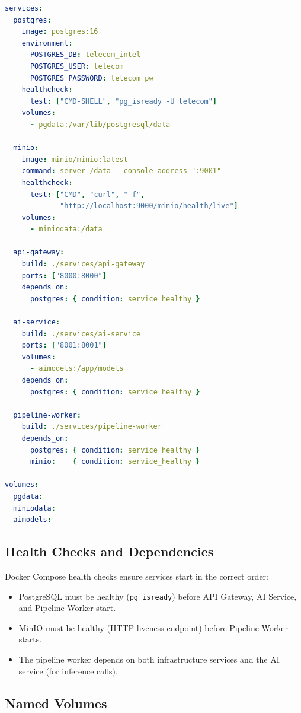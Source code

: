 \begin{lstlisting}[language=yaml, caption={Docker Compose configuration (simplified).}]
services:
  postgres:
    image: postgres:16
    environment:
      POSTGRES_DB: telecom_intel
      POSTGRES_USER: telecom
      POSTGRES_PASSWORD: telecom_pw
    healthcheck:
      test: ["CMD-SHELL", "pg_isready -U telecom"]
    volumes:
      - pgdata:/var/lib/postgresql/data

  minio:
    image: minio/minio:latest
    command: server /data --console-address ":9001"
    healthcheck:
      test: ["CMD", "curl", "-f", 
             "http://localhost:9000/minio/health/live"]
    volumes:
      - miniodata:/data

  api-gateway:
    build: ./services/api-gateway
    ports: ["8000:8000"]
    depends_on:
      postgres: { condition: service_healthy }

  ai-service:
    build: ./services/ai-service
    ports: ["8001:8001"]
    volumes:
      - aimodels:/app/models
    depends_on:
      postgres: { condition: service_healthy }

  pipeline-worker:
    build: ./services/pipeline-worker
    depends_on:
      postgres: { condition: service_healthy }
      minio:    { condition: service_healthy }

volumes:
  pgdata:
  miniodata:
  aimodels:
\end{lstlisting}

\subsection{Health Checks and Dependencies}

Docker Compose health checks ensure services start in the correct order:
\begin{itemize}
  \item PostgreSQL must be healthy (\texttt{pg\_isready}) before API Gateway, AI Service, and Pipeline Worker start.
  \item MinIO must be healthy (HTTP liveness endpoint) before Pipeline Worker starts.
  \item The pipeline worker depends on both infrastructure services and the AI service (for inference calls).
\end{itemize}

\subsection{Named Volumes}

